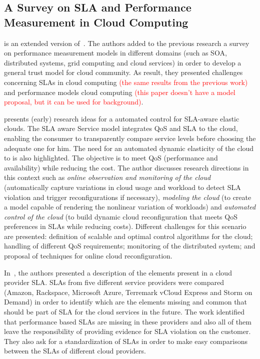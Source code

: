 \documentclass[12pt,a4paper,oneside]{article}
\begin{document}
\subsection{A Survey on SLA and Performance Measurement in Cloud Computing}

\cite{004} is an extended version of~\cite{003}. The authors added to the previous research a survey on performance measurement models in different domains (such as SOA, distributed systems, grid computing and cloud services) in order to develop a general trust model for cloud community. As result, they presented challenges concerning SLAs in cloud computing \textcolor{red}{(the same results from the previous work)} and performance models cloud computing \textcolor{red}{(this paper doesn't have a model proposal, but it can be used for background)}.

\bigskip
\cite{013} presents (early) research ideas for a automated control for SLA-aware elastic clouds. The SLA aware Service model integrates QoS and SLA to the cloud, enabling the consumer to transparently compare service levels before choosing the adequate one for him. The need for an automated dynamic elasticity of the cloud to is also highlighted. The objective is to meet QoS (performance and availability) while reducing the cost. The author discusses research directions in this context such as \textit{online observation and monitoring of the cloud} (automatically capture variations in cloud usage and workload to detect SLA violation and trigger reconfigurations if necessary), \textit{modeling the cloud} (to create a model capable of rendering the nonlinear variation of workloads) and \textit{automated control of the cloud} (to build dynamic cloud reconfiguration that meets QoS preferences in SLAs while reducing costs). Different challenges for this scenario are presented: definition of scalable and optimal control algorithms for the cloud; handling of different QoS requirements; monitoring of the distributed system; and proposal of techniques for online cloud reconfiguration.

\bigskip
In~\cite{010}, the authors presented a description of the elements present in a cloud provider SLA. SLAs from five different service providers were compared (Amazon, Rackspace, Microsoft Azure, Terremark vCloud Express and Storm on Demand) in order to identify which are the elements missing and common that should be part of SLA for the cloud services in the future. The work identified that performance based SLAs are missing in these providers and also all of them leave the responsibility of providing evidence for SLA violation on the customer. They also ask for a standardization of SLAs in order to make easy comparisons between the SLAs of different cloud providers.
\end{document}
